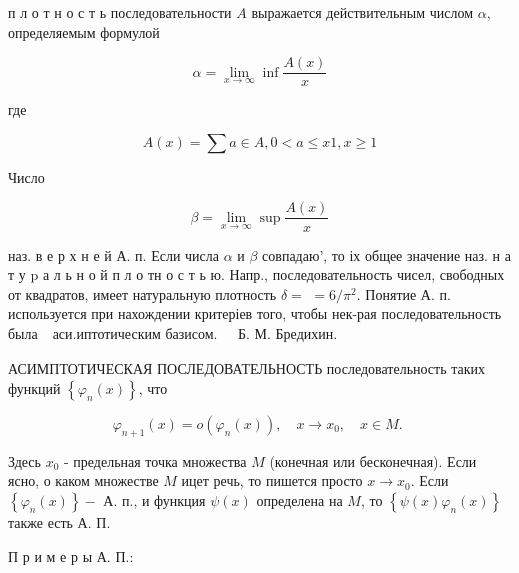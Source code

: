 \documentclass[10pt]{article}
\begin{document}
п л о т н о с т ь последовательности $A$ выражается действительным числом $\alpha$, определяемым формулой



\[

\alpha=\lim _{x \rightarrow \infty} \inf \frac{A(x)}{x}

\]



где



\[

A(x)=\sum a \in A, 0<a \leqslant x 1, x \geqslant 1

\]



Число



\[

\beta=\lim _{x \rightarrow \infty} \sup \frac{A(x)}{x}

\]



наз. в е р х н е й А. п. Если числа $\alpha$ и $\beta$ совпадаю', то іх общее значение наз. н а т у $\mathrm{p}$ а л ь н о й п л о тн о с т ь ю. Напр., последовательность чисел, свободных от квадратов, имеет натуральную плотность $\delta=$ $=6 / \pi^{2}$. Понятие А. п. используется при нахождении критеріев того, чтобы нек-рая последовательность была $\begin{array}{ll}\text { аси.иптотическим базисом. } & \text { Б. М. Бредихин. }\end{array}$



АСИМПТОТИЧЕСКАЯ ПОСЛЕДОВАТЕЛЬНОСТЬ последовательность таких функций $\left\{\varphi_{n}(x)\right\}$, что



\[

\varphi_{n+1}(x)=o\left(\varphi_{n}(x)\right), \quad x \longrightarrow x_{0}, \quad x \in M \text {. }

\]



Здесь $x_{0}$ - предельная точка множества $M$ (конечная или бесконечная). Если ясно, о каком множестве $M$ ицет речь, то пишется просто $x \rightarrow x_{0}$. Если $\left\{\varphi_{n}(x)\right\}-$ А. п., и функция $\psi(x)$ определена на $M$, то $\left\{\psi(x) \varphi_{n}(x)\right\}$ также есть А. П.



П р и м е р ы А. П.:
\end{document}
